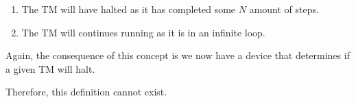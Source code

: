 \documentclass{report}
\begin{document}
\begin{enumerate}
  \item The TM will have halted as it has completed some $N$ amount of steps.
  \item The TM will continues running as it is in an infinite loop.
\end{enumerate}

Again, the consequence of this concept is we now have a device that determines if a given TM will halt.

Therefore, this definition cannot exist.



\end{document}
